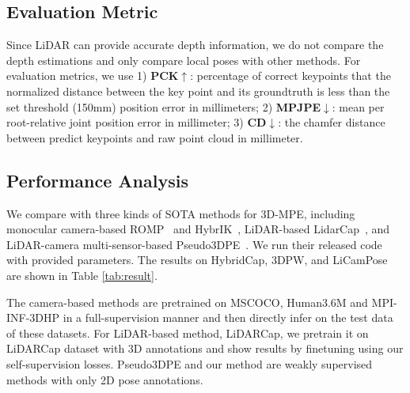\documentclass[letterpaper]{article} %
\begin{document}

\subsection{Evaluation Metric}
 Since LiDAR can provide accurate depth information, we do not compare the depth estimations and only compare local poses with other methods. For evaluation metrics, we use 1) \textbf{PCK$\uparrow$}: percentage of correct keypoints that the normalized distance between the key point and its groundtruth is less than the set threshold (150mm)
position error in millimeters; 2) \textbf{MPJPE$\downarrow$}: mean per root-relative joint position error in millimeter; 3)  \textbf{CD$\downarrow$}: the chamfer
distance between predict keypoints and raw point cloud in millimeter. 
\subsection{Performance Analysis}
We compare with three kinds of SOTA methods for 3D-MPE, including monocular camera-based ROMP~\cite{sun2021monocular} and HybrIK~\cite{li2021hybrik}, LiDAR-based LidarCap~\cite{li2022lidarcap}, and LiDAR-camera multi-sensor-based Pseudo3DPE~\cite{zhang2022mutual}. We run their released code with provided parameters. The results on HybridCap, 3DPW, and LiCamPose are shown in Table \ref{tab:result}. 


The camera-based methods are pretrained on MSCOCO, Human3.6M\cite{ionescu2013human3} and MPI-INF-3DHP \cite{mehta2017monocular} in a full-supervision manner and then directly infer on the test data of these datasets. 
For LiDAR-based method, LiDARCap, we pretrain it on LiDARCap dataset with 3D annotations and show results by finetuning using our self-supervision losses. 
Pseudo3DPE and our method are weakly supervised methods with only 2D pose annotations. 
\end{document}
